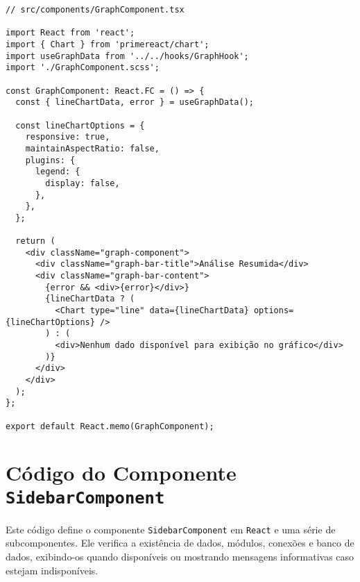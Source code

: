 \begin{verbatim}
// src/components/GraphComponent.tsx

import React from 'react';
import { Chart } from 'primereact/chart';
import useGraphData from '../../hooks/GraphHook';
import './GraphComponent.scss';

const GraphComponent: React.FC = () => {
  const { lineChartData, error } = useGraphData();

  const lineChartOptions = {
    responsive: true,
    maintainAspectRatio: false,
    plugins: {
      legend: {
        display: false,
      },
    },
  };

  return (
    <div className="graph-component">
      <div className="graph-bar-title">Análise Resumida</div>
      <div className="graph-bar-content">
        {error && <div>{error}</div>}
        {lineChartData ? (
          <Chart type="line" data={lineChartData} options={lineChartOptions} />
        ) : (
          <div>Nenhum dado disponível para exibição no gráfico</div>
        )}
      </div>
    </div>
  );
};

export default React.memo(GraphComponent);
\end{verbatim}
\chapter{Código do Componente \texttt{SidebarComponent}}
\label{Anexo:CodigoSidebar}

Este código define o componente \texttt{SidebarComponent} em \texttt{React} e uma série de subcomponentes. Ele verifica a existência de dados, módulos, conexões e banco de dados, exibindo-os quando disponíveis ou mostrando mensagens informativas caso estejam indisponíveis.

